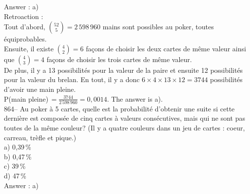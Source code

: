 ﻿\documentclass[letterpaper, 12pt]{article}
\begin{document}
Answer : a)\\

Retroaction : \\
Tout d'abord, $\binom{52}{5}=2\,598\,960$ mains sont possibles au poker,
toutes \'equiprobables.  \\[2mm]
Ensuite, il existe $\binom{4}{2}=6$ fa\c cons de choisir les deux
cartes de m\^eme valeur ainsi que $\binom{4}{3}=4$ fa\c cons de choisir les
trois cartes de m\^eme valeur.  \\[2mm]
De plus, il y a 13 possibilit\'es pour la valeur de la paire et ensuite 12
possibilit\'es pour la valeur du brelan.  En tout, il y a donc
$6\times4\times13\times12=3744$ possibilit\'es d'avoir une main pleine.
\\[2mm]
P(main pleine)$\,=\frac{3744}{2\,598\,960}=0,0014$.  The answer is
a).\\[2mm]

864-- Au poker \`a 5 cartes, quelle est la probabilit\'e d'obtenir une suite
si cette derni\`ere est compos\'ee de cinq cartes \`a valeurs
cons\'ecutives, mais qui ne sont pas toutes de la m\^eme couleur? (Il y a
quatre couleurs dans un jeu de cartes : coeur, carreau, tr\`efle et
pique.)\\
a) 0,39\,\%\\
b) 0,47\,\%\\
c) 39\,\%\\
d) 47\,\%\\

Answer : a)\\
\end{document}
